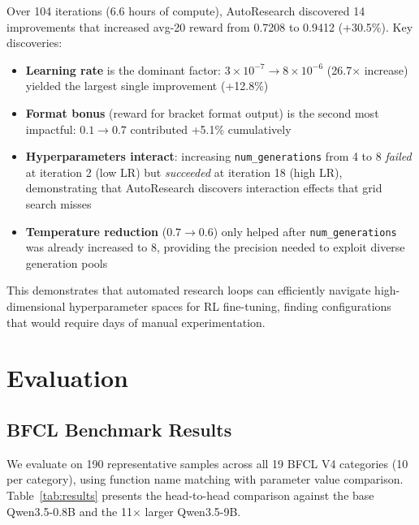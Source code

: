 \documentclass[10pt,twocolumn]{article}
\begin{document}
Over 104 iterations (6.6 hours of compute), AutoResearch discovered 14 improvements that increased avg-20 reward from 0.7208 to 0.9412 (+30.5\%). Key discoveries:

\begin{itemize}[itemsep=1pt]
    \item \textbf{Learning rate} is the dominant factor: $3 \times 10^{-7} \to 8 \times 10^{-6}$ (26.7$\times$ increase) yielded the largest single improvement (+12.8\%)
    \item \textbf{Format bonus} (reward for bracket format output) is the second most impactful: $0.1 \to 0.7$ contributed +5.1\% cumulatively
    \item \textbf{Hyperparameters interact}: increasing \texttt{num\_generations} from 4 to 8 \textit{failed} at iteration 2 (low LR) but \textit{succeeded} at iteration 18 (high LR), demonstrating that AutoResearch discovers interaction effects that grid search misses
    \item \textbf{Temperature reduction} ($0.7 \to 0.6$) only helped after \texttt{num\_generations} was already increased to 8, providing the precision needed to exploit diverse generation pools
\end{itemize}

This demonstrates that automated research loops can efficiently navigate high-dimensional hyperparameter spaces for RL fine-tuning, finding configurations that would require days of manual experimentation.

\clearpage
\section{Evaluation}

\subsection{BFCL Benchmark Results}

We evaluate on 190 representative samples across all 19 BFCL V4 categories (10 per category), using function name matching with parameter value comparison. Table~\ref{tab:results} presents the head-to-head comparison against the base Qwen3.5-0.8B and the 11$\times$ larger Qwen3.5-9B.
\end{document}
